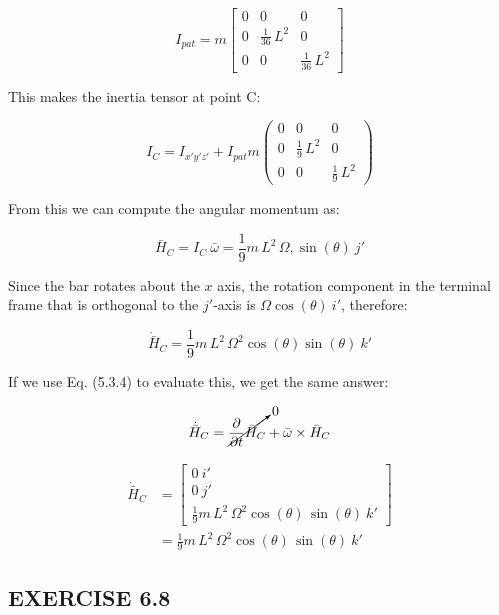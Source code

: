\documentclass[12pt, letterpaper]{../assignment}
\begin{document}
$$ I_{pat} = 
m\left[\begin{array}{ccc} 0 & 0 & 0\\ 0 & \frac{1}{36}\,L^2 & 0\\ 0 & 0 & \frac{1}{36}\,L^2 \end{array}\right]$$


This makes the inertia tensor at point C:

$$ I_{C} = I_{x'y'z'} + I_{pat}
m\left(\begin{array}{ccc} 0 & 0 & 0\\ 0 & \frac{1}{9}\,L^2 & 0\\ 0 & 0 & \frac{1}{9}\,L^2 \end{array}\right)$$

From this we can compute the angular momentum as:

\begin{answer}
$$ \bar{H}_C = I_{C}\ \bar{\omega} = \frac{1}{9}m\,L^2\,\Omega ,\sin\left(\theta \right)\ j' $$
\end{answer}

Since the bar rotates about the $x$ axis, the rotation component in the terminal frame that is orthogonal to the $j'$-axis is $\Omega\cos(\theta)\ i'$, therefore:
\begin{answer}
$$ \dot{\bar{H}}_C = \frac{1}{9}m\,L^2\,\Omega^2 \cos\left(\theta \right)\sin\left(\theta \right)\ k' $$
\end{answer}

If we use Eq. (5.3.4) to evaluate this, we get the same answer:

$$ \dot{\bar{H}}_C = \cancelto{0}{\frac{\partial}{\partial t} \bar{H}_C} + \bar{\omega} \times \bar{H}_C $$

\begin{answer}
\begin{equation*}
    \begin{aligned}
\dot{\bar{H}}_C &= \left[\begin{array}{r} 0 \ i'\\ 0\ j'\\ \frac{1}{9}m\,L^2\,\Omega ^2\cos\left(\theta \right)\,\sin\left(\theta \right)\ k' \end{array}\right]\\
&= \frac{1}{9}m\,L^2\,\Omega ^2\cos\left(\theta \right)\,\sin\left(\theta \right)\ k'
\end{aligned}
\end{equation*}
\end{answer}

\subsection*{EXERCISE 6.8}
\end{document}
